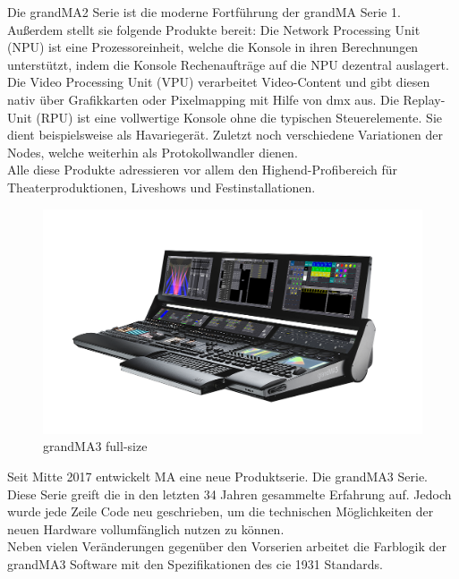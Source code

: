 \documentclass[11pt]{scrartcl}
\begin{document}
\noindent
Die grandMA2 Serie ist die moderne Fortführung der grandMA Serie 1. Außerdem stellt sie
folgende Produkte bereit: Die Network Processing Unit (NPU) ist eine Prozessoreinheit, welche die
Konsole in ihren Berechnungen unterstützt, indem die Konsole Rechenaufträge auf die NPU dezentral
auslagert. Die Video Processing Unit (VPU) verarbeitet Video-Content und gibt diesen nativ über
Grafikkarten oder Pixelmapping mit Hilfe von \ac{dmx} aus. Die Replay-Unit (RPU) ist eine vollwertige
Konsole ohne die typischen Steuerelemente. Sie dient beispielsweise als Havariegerät. Zuletzt noch
verschiedene Variationen der Nodes, welche weiterhin als Protokollwandler dienen.\\
Alle diese Produkte adressieren vor allem den Highend-Profibereich für Theaterproduktionen,
Liveshows und Festinstallationen.\\
\begin{figure}[H]
    \includegraphics[width=\textwidth]{images/grandMA3-full-size.png}
    \caption[grandMA3 full-size]{grandMA3 full-size \cite{gma3}}\label{fig:gma3}
\end{figure}
\noindent
Seit Mitte 2017 entwickelt MA eine neue Produktserie. Die grandMA3 Serie. Diese Serie greift die
in den letzten 34 Jahren gesammelte Erfahrung auf. Jedoch wurde jede Zeile Code neu geschrieben,
um die technischen Möglichkeiten der neuen Hardware vollumfänglich nutzen zu können.\\
Neben vielen Veränderungen gegenüber den Vorserien arbeitet die Farblogik der \mbox{grandMA3} Software
mit den Spezifikationen des \ac{cie} 1931 Standards.
\clearpage

\end{document}
